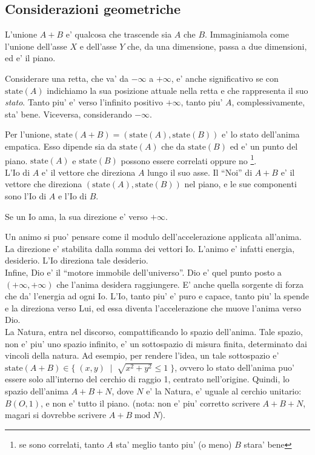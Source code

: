 \subsection{Considerazioni geometriche}
L'unione $A+B$ e' qualcosa che trascende sia $A$ che $B$. Immaginiamola come l'unione dell'asse $X$ e dell'asse $Y$ che, da una dimensione, passa a due dimensioni, ed e' il piano.

\def\state{\textrm{state}}

Considerare una retta, che va' da $-\infty$ a $+\infty$, e' anche significativo se con $\state(A)$ indichiamo la sua posizione attuale nella retta e che rappresenta il suo \emph{stato}. Tanto piu' e' verso l'infinito positivo $+\infty$, tanto piu' $A$, complessivamente, sta' bene. Viceversa, considerando $-\infty$.

Per l'unione, $\state(A+B)=(\state(A),\state(B))$ e' lo stato dell'anima empatica. Esso dipende sia da $\state(A)$ che da $\state(B)$ ed e' un punto del piano. $\state(A)$ e $\state(B)$ possono essere correlati oppure no \footnote{se sono correlati, tanto $A$ sta' meglio tanto piu' (o meno) $B$ stara' bene}.\\

L'Io di $A$ e' il vettore che direziona $A$ lungo il suo asse. Il ``Noi'' di $A+B$ e' il vettore che direziona $(\state(A),\state(B))$ nel piano, e le sue componenti sono l'Io di $A$ e l'Io di $B$.

Se un Io ama, la sua direzione e' verso $+\infty$.

Un animo si puo' pensare come il modulo dell'accelerazione applicata all'anima. La direzione e' stabilita dalla somma dei vettori Io. L'animo e' infatti energia, desiderio. L'Io direziona tale desiderio.\\

Infine, Dio e' il ``motore immobile dell'universo''. Dio e' quel punto posto a $(+\infty, +\infty)$ che l'anima desidera raggiungere. E' anche quella sorgente di forza che da' l'energia ad ogni Io. L'Io, tanto piu' e' puro e capace, tanto piu' la spende e la direziona verso Lui, ed essa diventa l'accelerazione che muove l'anima verso Dio.\\

La Natura, entra nel discorso, compattificando lo spazio dell'anima. Tale spazio, non e' piu' uno spazio infinito, e' un sottospazio di misura finita, determinato dai vincoli della natura. Ad esempio, per rendere l'idea, un tale sottospazio e' $\state(A+B) \in \{\; (x,y) \;\; | \;\; \sqrt{x^2+y^2} \le 1 \;\}$, ovvero lo stato dell'anima puo' essere solo all'interno del cerchio di raggio 1, centrato nell'origine. Quindi, lo spazio dell'anima $A+B+N$, dove $N$ e' la Natura, e' uguale al cerchio unitario: $B(O,1)$, e non e' tutto il piano. (nota: non e' piu' corretto scrivere $A+B+N$, magari si dovrebbe scrivere $A+B\;\textrm{mod}\;N$).\\

